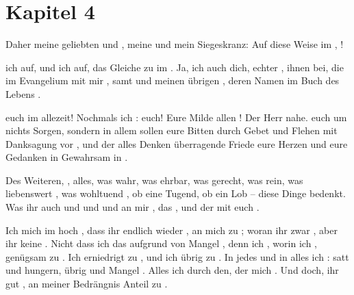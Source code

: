 \section*{Kapitel 4}
Daher meine geliebten und  , meine  und mein Siegeskranz: Auf diese Weise   im , !

  ich auf, und   ich auf, das Gleiche zu  im . Ja, ich  auch dich, echter ,  ihnen bei, die im Evangelium mit mir , samt  und meinen übrigen , deren Namen im Buch des Lebens .

 euch im  allezeit! Nochmals  ich :  euch! Eure Milde  allen  ! Der Herr  nahe.  euch um nichts Sorgen, sondern in allem sollen eure Bitten durch Gebet und Flehen mit Danksagung vor  , und der alles Denken überragende Friede   eure Herzen und eure Gedanken in Gewahrsam  in .

Des Weiteren, , alles, was wahr, was ehrbar, was gerecht, was rein, was liebenswert , was wohltuend , ob eine Tugend, ob ein Lob -- diese Dinge bedenkt.  Was ihr auch  und  und  und an mir  , das , und der   mit euch .

Ich  mich im  hoch , dass ihr endlich wieder  , an mich zu ; woran ihr zwar , aber ihr  keine . Nicht dass ich das aufgrund von Mangel , denn ich , worin ich , genügsam zu . Ich  erniedrigt zu , und ich  übrig zu . In jedes und in alles  ich : satt  und hungern, übrig  und Mangel . Alles  ich durch den, der mich  . Und doch, ihr  gut  , an meiner Bedrängnis Anteil zu .

